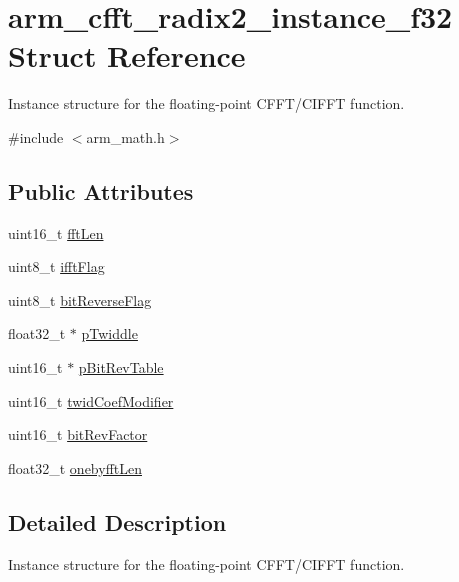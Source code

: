 \hypertarget{structarm__cfft__radix2__instance__f32}{}\section{arm\+\_\+cfft\+\_\+radix2\+\_\+instance\+\_\+f32 Struct Reference}
\label{structarm__cfft__radix2__instance__f32}


Instance structure for the floating-\/point C\+F\+F\+T/\+C\+I\+F\+FT function.  




{\ttfamily \#include $<$arm\+\_\+math.\+h$>$}

\subsection*{Public Attributes}
\begin{DoxyCompactItemize}
\item 
uint16\+\_\+t \hyperlink{structarm__cfft__radix2__instance__f32_a2f915a1c29635c1623086aaaa726be8f}{fft\+Len}
\item 
uint8\+\_\+t \hyperlink{structarm__cfft__radix2__instance__f32_a8dbe98d2c924e35e0a3fed2fe948176f}{ifft\+Flag}
\item 
uint8\+\_\+t \hyperlink{structarm__cfft__radix2__instance__f32_af713b4ac5256a19bc965c89fe3005fa3}{bit\+Reverse\+Flag}
\item 
float32\+\_\+t $\ast$ \hyperlink{structarm__cfft__radix2__instance__f32_adb0c9d47dbfbd90a6f6ed0a05313a974}{p\+Twiddle}
\item 
uint16\+\_\+t $\ast$ \hyperlink{structarm__cfft__radix2__instance__f32_a92b8fa0a151cd800436094903a5ca0a4}{p\+Bit\+Rev\+Table}
\item 
uint16\+\_\+t \hyperlink{structarm__cfft__radix2__instance__f32_a411f75b6ed01690293f4f5988030ea42}{twid\+Coef\+Modifier}
\item 
uint16\+\_\+t \hyperlink{structarm__cfft__radix2__instance__f32_ac1688dafa5177f6b1505abbfd0cf8b21}{bit\+Rev\+Factor}
\item 
float32\+\_\+t \hyperlink{structarm__cfft__radix2__instance__f32_a1d3d289d47443e597d88a40effd14b8f}{onebyfft\+Len}
\end{DoxyCompactItemize}


\subsection{Detailed Description}
Instance structure for the floating-\/point C\+F\+F\+T/\+C\+I\+F\+FT function. 

